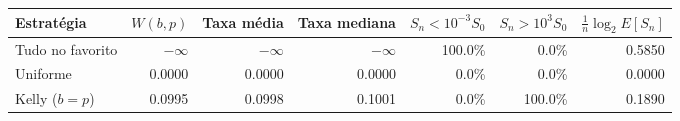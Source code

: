 \begin{tabular}{lrrrrrr}
\toprule
Estratégia & $W(b,p)$ & Taxa média & Taxa mediana & $S_n<10^{-3}S_0$ & $S_n>10^{3}S_0$ & $\frac1n\log_2 E[S_n]$ \\
\midrule
Tudo no favorito & $-\infty$ & $-\infty$ & $-\infty$ & 100.0\% & 0.0\% & 0.5850 \\
Uniforme & 0.0000 & 0.0000 & 0.0000 & 0.0\% & 0.0\% & 0.0000 \\
Kelly ($b=p$) & 0.0995 & 0.0998 & 0.1001 & 0.0\% & 100.0\% & 0.1890 \\
\bottomrule
\end{tabular}
